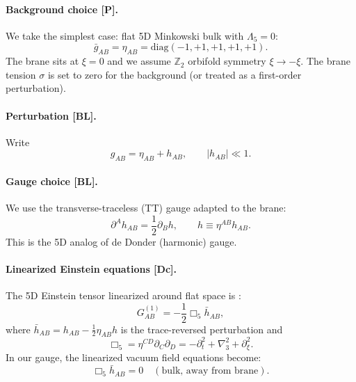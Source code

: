 \documentclass[11pt,a4paper]{article}
\newcommand{\tagBL}{\textcolor{blue!70!black}{[BL]}}
\newcommand{\tagP}{\textcolor{orange!80!black}{[P]}}
\newcommand{\tagDc}{\textcolor{purple!70!black}{[Dc]}}
\begin{document}
\paragraph{Background choice \tagP{}.}
We take the simplest case: flat 5D Minkowski bulk with $\Lambda_5 = 0$:
\begin{equation}
    \bar{g}_{AB} = \eta_{AB} = \text{diag}(-1, +1, +1, +1, +1).
    \label{eq:background}
\end{equation}
The brane sits at $\xi = 0$ and we assume $\mathbb{Z}_2$ orbifold symmetry $\xi \to -\xi$.
The brane tension $\sigma$ is set to zero for the background (or treated as a first-order perturbation).

\paragraph{Perturbation \tagBL{}.}
Write
\begin{equation}
    g_{AB} = \eta_{AB} + h_{AB}, \qquad |h_{AB}| \ll 1.
    \label{eq:perturbation}
\end{equation}

\paragraph{Gauge choice \tagBL{}.}
We use the transverse-traceless (TT) gauge adapted to the brane:
\begin{equation}
    \partial^A h_{AB} = \frac{1}{2} \partial_B h, \qquad h \equiv \eta^{AB} h_{AB}.
    \label{eq:gauge}
\end{equation}
This is the 5D analog of de Donder (harmonic) gauge.

\paragraph{Linearized Einstein equations \tagDc{}.}
The 5D Einstein tensor linearized around flat space is \cite{MTW,Wald}:
\begin{equation}
    G_{AB}^{(1)} = -\frac{1}{2} \Box_5 \bar{h}_{AB},
    \label{eq:linearized_G}
\end{equation}
where $\bar{h}_{AB} = h_{AB} - \frac{1}{2}\eta_{AB} h$ is the trace-reversed perturbation and
\begin{equation}
    \Box_5 = \eta^{CD}\partial_C \partial_D = -\partial_t^2 + \nabla^2_3 + \partial_\xi^2.
\end{equation}
In our gauge, the linearized vacuum field equations become:
\begin{equation}
    \boxed{\Box_5 \bar{h}_{AB} = 0 \quad (\text{bulk, away from brane}).}
    \label{eq:bulk_eom}
\end{equation}
\end{document}
